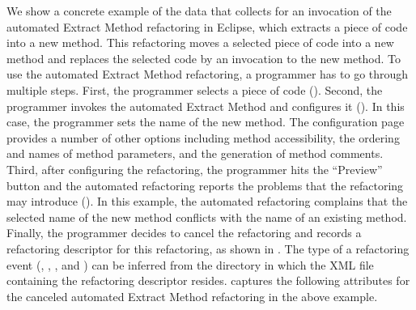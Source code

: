 We show a concrete example of the data that \CodingSpectator{}
collects for an invocation of the automated Extract Method refactoring
in Eclipse, which extracts a piece of code into a new method. This
refactoring moves a selected piece of code into a new method and
replaces the selected code by an invocation to the new method. To use
the automated Extract Method refactoring, a programmer has to go
through multiple steps. First, the programmer selects a piece of code
(). Second,
the programmer invokes the automated Extract Method and configures it
(). In
this case, the programmer sets the name of the new method. The
configuration page provides a number of other options including method
accessibility, the ordering and names of method parameters, and the
generation of method comments. Third, after configuring the
refactoring, the programmer hits the ``Preview'' button and the
automated refactoring reports the problems that the refactoring may
introduce (). In
this example, the automated refactoring complains that the selected
name of the new method conflicts with the name of an existing
method. Finally, the programmer decides to cancel the refactoring and
\CodingSpectator{} records a refactoring descriptor for this
\Canceled{} refactoring, as shown in
. The type of a
refactoring event (\ie, \Unavailable, \Canceled, and \Performed) can
be inferred from the directory in which the XML file containing the
refactoring descriptor resides.  \CodingSpectator{} captures the
following attributes for the canceled automated Extract Method
refactoring in the above example.

